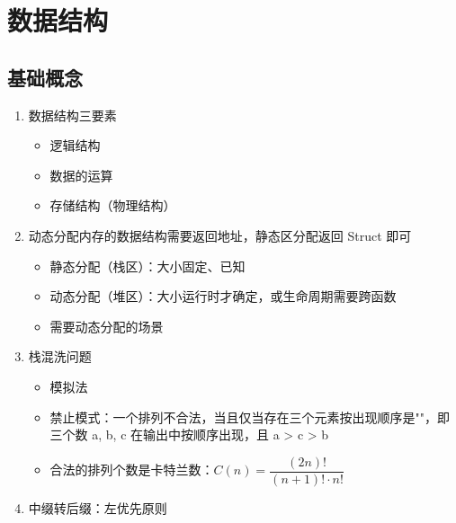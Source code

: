 \documentclass[a4paper,12pt]{article}
\begin{document}



    \section{数据结构}

    \subsection{基础概念}

    \begin{enumerate}
        \item 数据结构三要素
        \begin{itemize}
            \item 逻辑结构
            \item 数据的运算
            \item 存储结构（物理结构）
        \end{itemize}
        \item 动态分配内存的数据结构需要返回地址，静态区分配返回 Struct 即可
        \begin{itemize}
            \item 静态分配（栈区）：大小固定、已知
            \item 动态分配（堆区）：大小运行时才确定，或生命周期需要跨函数
            \item 需要动态分配的场景
        \end{itemize}
        \item 栈混洗问题
        \begin{itemize}
            \item 模拟法
            \item 禁止模式：一个排列不合法，当且仅当存在三个元素按出现顺序是"{\color{red}{大、小、中}}"，即三个数 a, b, c 在输出中按顺序出现，且 a > c > b
            \item 合法的排列个数是卡特兰数：$C(n) = \dfrac{(2n)!}{(n+1)! \cdot n!}$
        \end{itemize}
        \item 中缀转后缀：左优先原则
    \end{enumerate}
\end{document}
